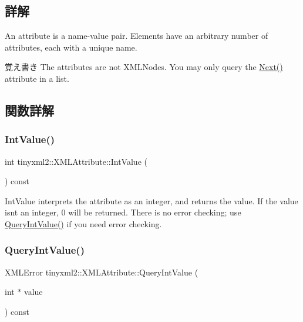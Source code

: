 \subsection{詳解}
An attribute is a name-\/value pair. Elements have an arbitrary number of attributes, each with a unique name.

\begin{DoxyNote}{覚え書き}
The attributes are not X\+M\+L\+Nodes. You may only query the \hyperlink{classtinyxml2_1_1_x_m_l_attribute_aee53571b21e7ce5421eb929523a8bbe6}{Next()} attribute in a list. 
\end{DoxyNote}


\subsection{関数詳解}
\mbox{\label{classtinyxml2_1_1_x_m_l_attribute_adfa2433f0fdafd5c3880936de9affa80}} 
\subsubsection{\texorpdfstring{Int\+Value()}{IntValue()}}
{\footnotesize\ttfamily int tinyxml2\+::\+X\+M\+L\+Attribute\+::\+Int\+Value (\begin{DoxyParamCaption}{ }\end{DoxyParamCaption}) const\hspace{0.3cm}{\ttfamily [inline]}}

Int\+Value interprets the attribute as an integer, and returns the value. If the value isn\textquotesingle{}t an integer, 0 will be returned. There is no error checking; use \hyperlink{classtinyxml2_1_1_x_m_l_attribute_a6d5176260db00ea301c01af8457cd993}{Query\+Int\+Value()} if you need error checking. \mbox{\label{classtinyxml2_1_1_x_m_l_attribute_a6d5176260db00ea301c01af8457cd993}} 
\subsubsection{\texorpdfstring{Query\+Int\+Value()}{QueryIntValue()}}
{\footnotesize\ttfamily X\+M\+L\+Error tinyxml2\+::\+X\+M\+L\+Attribute\+::\+Query\+Int\+Value (\begin{DoxyParamCaption}\item[{int $\ast$}]{value }\end{DoxyParamCaption}) const}

